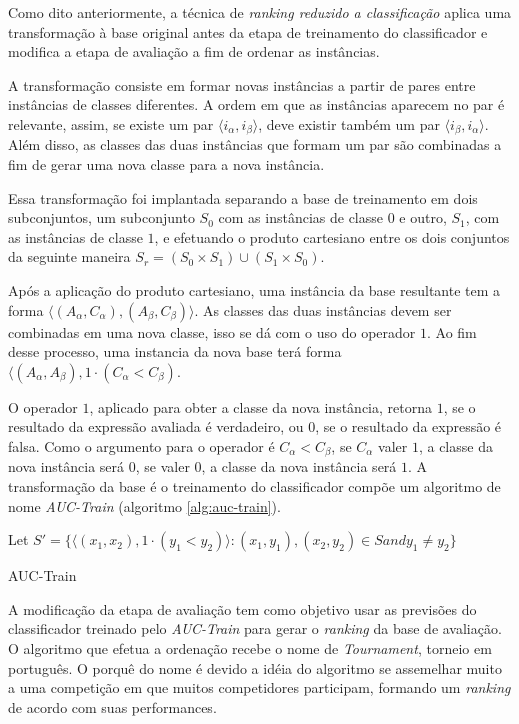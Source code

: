 Como dito anteriormente, a técnica de \emph{ranking reduzido a classificação} aplica uma transformação à base original antes da etapa de treinamento do classificador e modifica a etapa de avaliação a fim de ordenar as instâncias.

A transformação consiste em formar novas instâncias a partir de pares entre instâncias de classes diferentes. A ordem em que as instâncias aparecem no par é relevante, assim, se existe um par $\langle i_\alpha, i_\beta \rangle$, deve existir também um par $\langle i_\beta, i_\alpha \rangle$. Além disso, as classes das duas instâncias que formam um par são combinadas a fim de gerar uma nova classe para a nova instância.

Essa transformação foi implantada separando a base de treinamento em dois subconjuntos, um subconjunto $S_0$ com as instâncias de classe $0$ e outro, $S_1$, com as instâncias de classe $1$, e efetuando o produto cartesiano entre os dois conjuntos da seguinte maneira $S_r = (S_0 \times S_1) \cup (S_1 \times S_0)$.

Após a aplicação do produto cartesiano, uma instância da base resultante tem a forma $\langle (A_\alpha, C_\alpha), (A_\beta, C_\beta) \rangle$. As classes das duas instâncias devem ser combinadas em uma nova classe, isso se dá com o uso do operador $1$. Ao fim desse processo, uma instancia da nova base terá forma $\langle (A_\alpha, A_\beta), 1 \cdot (C_\alpha < C_\beta)$.

O operador $1$, aplicado para obter a classe da nova instância, retorna $1$, se o resultado da expressão avaliada é verdadeiro, ou $0$, se o resultado da expressão é falsa. Como o argumento para o operador é $C_\alpha < C_\beta$, se $C_\alpha$ valer $1$, a classe da nova instância será $0$, se valer $0$, a classe da nova instância será $1$. A transformação da base é o treinamento do classificador compõe um algoritmo de nome \emph{AUC-Train} (algoritmo \ref{alg:auc-train}).

\begin{algorithm}
    Let $S' = \{\langle (x_1, x_2), 1 \cdot (y_1 < y_2) \rangle : (x_1, y_1), (x_2, y_2) \in S and y_1 \neq y_2\}$
    
    \caption{AUC-Train}
    \label{alg:auc-train}
\end{algorithm}

A modificação da etapa de avaliação tem como objetivo usar as previsões do classificador treinado pelo \emph{AUC-Train} para gerar o \emph{ranking} da base de avaliação. O algoritmo que efetua a ordenação recebe o nome de \emph{Tournament}, torneio em português. O porquê do nome é devido a idéia do algoritmo se assemelhar muito a uma competição em que muitos competidores participam, formando um \emph{ranking} de acordo com suas performances.

